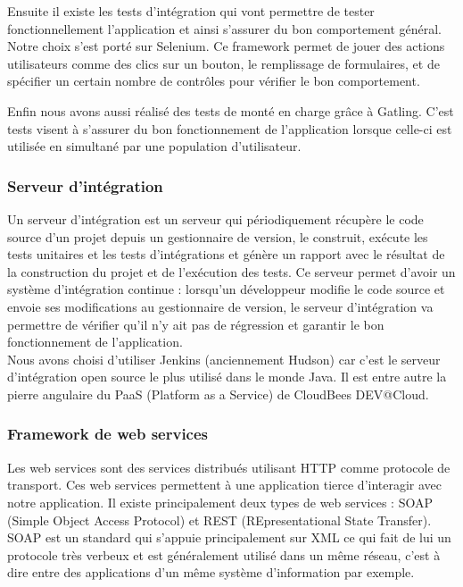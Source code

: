 Ensuite il existe les tests d'intégration qui vont permettre de tester fonctionnellement l'application et ainsi s'assurer du bon comportement général. Notre choix s'est porté sur Selenium. Ce framework permet de jouer des actions utilisateurs comme des clics sur un bouton, le remplissage de formulaires, et de spécifier un certain nombre de contrôles pour vérifier le bon comportement.

Enfin nous avons aussi réalisé des tests de monté en charge grâce à Gatling. C'est tests visent à s'assurer du bon fonctionnement de l'application lorsque celle-ci est utilisée en simultané par une population d'utilisateur.

\subsubsection{Serveur d'intégration}

Un serveur d'intégration est un serveur qui périodiquement récupère le code source d'un projet depuis un gestionnaire de version, le construit, exécute les tests unitaires et les tests d'intégrations et génère un rapport avec le résultat de la construction du projet et de l'exécution des tests. Ce serveur permet d'avoir un système d'intégration continue : lorsqu'un développeur modifie le code source et envoie ses modifications au gestionnaire de version, le serveur d'intégration va permettre de vérifier qu'il n'y ait pas de régression et garantir le bon fonctionnement de l'application.\\

Nous avons choisi d'utiliser Jenkins (anciennement Hudson) car c'est le serveur d'intégration open source le plus utilisé dans le monde Java. Il est entre autre la pierre angulaire du PaaS (Platform as a Service) de CloudBees DEV@Cloud.

\subsubsection{Framework de web services}

Les web services sont des services distribués utilisant HTTP comme protocole de transport. Ces web services permettent à une application tierce d'interagir avec notre application. Il existe principalement deux types de web services : SOAP (Simple Object Access Protocol) et REST (REpresentational State Transfer).\\

SOAP est un standard qui s'appuie principalement sur XML ce qui fait de lui un protocole très verbeux et est généralement utilisé dans un même réseau, c'est à dire entre des applications d'un même système d'information par exemple.\\

